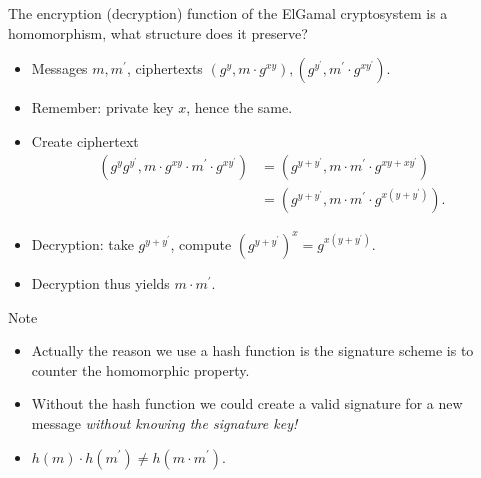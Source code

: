 \begin{frame}
  \begin{exercise}
    The encryption (decryption) function of the ElGamal cryptosystem is 
    a homomorphism, what structure does it preserve?
  \end{exercise}
\end{frame}

\begin{frame}
  \begin{example}
    \begin{itemize}
      \item Messages \(m, m^\prime\), ciphertexts \((g^y, m\cdot g^{xy}), 
          (g^{y^\prime}, m^\prime\cdot g^{x y^\prime})\).

      \item Remember: private key \(x\), hence the same.

        \pause{}

      \item Create ciphertext
        \begin{align*}
          (g^y g^{y^\prime}, m\cdot g^{xy}\cdot m^\prime\cdot g^{x y^\prime})
          &= (g^{y + y^\prime}, m\cdot m^\prime\cdot g^{xy + xy^\prime}) \\
          &= (g^{y + y^\prime}, m\cdot m^\prime\cdot g^{x(y + y^\prime)}).
        \end{align*}

        \pause{}

      \item Decryption: take \(g^{y + y^\prime}\), compute \((g^{y+y^\prime})^x 
          = g^{x(y + y^\prime)}\).

      \item Decryption thus yields \(m\cdot m^\prime\).

    \end{itemize}
  \end{example}
\end{frame}

\begin{frame}
  \begin{alertblock}{Note}
    \begin{itemize}
      \item Actually the reason we use a hash function is the signature scheme 
        is to counter the homomorphic property.

      \item Without the hash function we could create a valid signature for 
        a new message \emph{without knowing the signature key!}

        \pause{}

      \item \(h(m)\cdot h(m^\prime)\neq h(m\cdot m^\prime)\).
    \end{itemize}
  \end{alertblock}
\end{frame}

